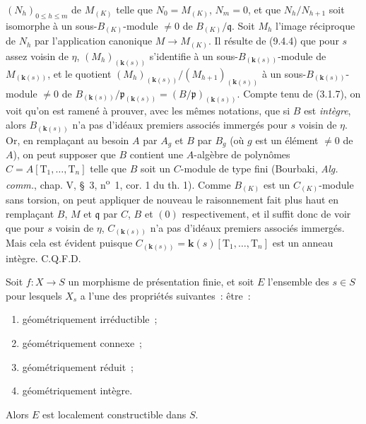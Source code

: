 $(N_h)_{0\leqslant h\leqslant m}$ de $M_{(K)}$ telle que $N_0=M_{(K)}$,
$N_m=0$, et que $N_h/N_{h+1}$ soit isomorphe à un sous-$B_{(K)}$-module
$\neq0$ de $B_{(K)}/\mathfrak q$. Soit $M_h$ l'image réciproque de $N_h$ par
l'application canonique $M\to M_{(K)}$. Il résulte de (9.4.4) que pour $s$
assez voisin de $\eta$, $(M_h)_{(\mathbf{k}(s))}$ s'identifie à un
sous-$B_{(\mathbf{k}(s))}$-module de $M_{(\mathbf{k}(s))}$, et le
quotient
$(M_h)_{(\mathbf{k}(s))}/(M_{h+1})_{(\mathbf{k}(s))}$ à un
sous-$B_{(\mathbf{k}(s))}$-module $\neq0$ de
$B_{(\mathbf{k}(s))}/\mathfrak p_{(\mathbf{k}(s))}
=(B/\mathfrak p)_{(\mathbf{k}(s))}$. Compte tenu de (3.1.7), on voit qu'on
est ramené à prouver, avec les mêmes notations, que si $B$ est \emph{intègre},
alors $B_{(\mathbf{k}(s))}$ n'a pas d'idéaux premiers associés immergés
pour $s$ voisin de $\eta$. Or, en remplaçant au besoin $A$ par $A_g$ et $B$ par
$B_g$ (où $g$ est un élément $\neq0$ de $A$), on peut supposer que $B$ contient
une $A$-algèbre de polynômes $C=A[\mathrm T_1,\ldots,\mathrm T_n]$ telle que
$B$ soit un $C$-module de type fini (Bourbaki, \emph{Alg. comm.}, chap. V,
\S~3, n\textsuperscript{o}~1, cor. 1 du th. 1). Comme $B_{(K)}$ est un $C_{(K)}$-module
sans torsion, on peut appliquer de nouveau le raisonnement fait plus haut en
remplaçant $B$, $M$ et $\mathfrak q$ par $C$, $B$ et $(0)$ respectivement, et
il suffit donc de voir que pour $s$ voisin de $\eta$, $C_{(\mathbf{k}(s))}$
n'a pas d'idéaux premiers associés immergés. Mais cela est évident puisque
$C_{(\mathbf{k}(s))}=\boldsymbol{k}(s)[\mathrm T_1,\ldots,\mathrm T_n]$
est un anneau intègre. C.Q.F.D.

\begin{theorem}[9.7.7]
\label{IV.9.7.7-fr}
Soit $f:X\to S$ un morphisme de présentation finie, et soit $E$ l'ensemble des
$s\in S$ pour lesquels $X_s$ a l'une des propriétés suivantes~: être~:
\begin{enumerate}[label=\textup{(\roman*)}]
  \item géométriquement irréductible~;
  \item géométriquement connexe~;
  \item géométriquement réduit~;
  \item géométriquement intègre.
\end{enumerate}
Alors $E$ est localement constructible dans $S$.
\end{theorem}

